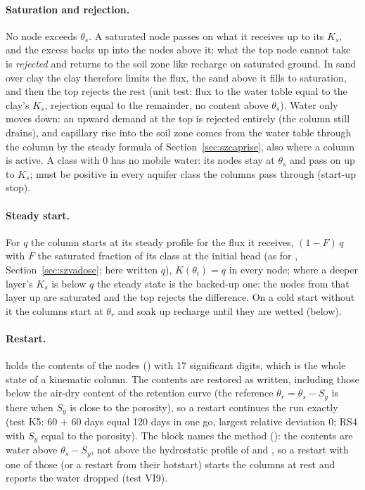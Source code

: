 \paragraph{Saturation and rejection.} No node exceeds $\theta_s$. A saturated node passes on what it receives up to its
$K_s$, and the excess backs up into the nodes above it; what the top node cannot take is \emph{rejected} and returns to
the soil zone like recharge on saturated ground. In sand over clay the clay therefore limits the flux, the sand above
it fills to saturation, and then the top rejects the rest (unit test: flux to the water table equal to the clay's
$K_s$, rejection equal to the remainder, no content above $\theta_s$). Water only moves down: an upward demand at the
top is rejected entirely (the column still drains), and capillary rise into the soil zone comes from the water table
through the column by the steady formula of Section~\ref{sec:szcaprise}, also where a column is active. A class with
 0 has no mobile water: its nodes stay at $\theta_s$ and pass on up to $K_s$;  must be
positive in every aquifer class the columns pass through (start-up stop).

\paragraph{Steady start.} For  $q$ the column starts at its steady profile for the
flux it receives, $(1-F)\,q$ with $F$ the saturated fraction of its class at the initial head (as for ,
Section~\ref{sec:szvadose}; here written $q$), $K(\theta_i)=q$ in every node; where a deeper layer's $K_s$ is below $q$ the steady state is the backed-up one: the nodes
from that layer up are saturated and the top rejects the difference. On a cold start without it the columns start
at $\theta_r$ and soak up recharge until they are wetted (below).

\paragraph{Restart.}  holds the contents of the nodes () with 17 significant
digits, which is the whole state of a kinematic column. The contents are restored as written, including those below the
air-dry content of the retention curve (the reference $\theta_r=\theta_s-S_y$ is there when $S_y$ is close to the
porosity), so a restart continues the run exactly (test K5: 60 + 60 days equal 120 days in one go, largest relative
deviation 0;  RS4 with $S_y$ equal to the porosity). The block names the method
(): the contents are water above $\theta_s-S_y$, not above the hydrostatic profile of
 and , so a restart with one of those (or a  restart from their hotstart) starts
the columns at rest and reports the water dropped (test VI9).

